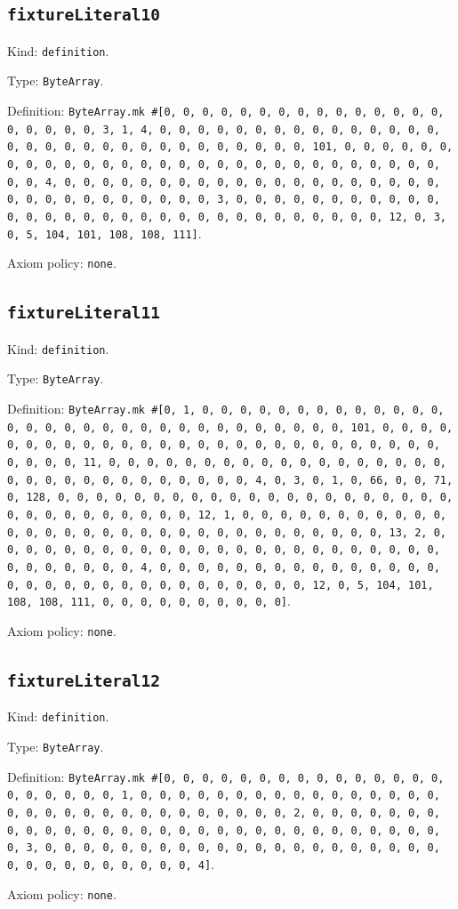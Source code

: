 \documentclass[11pt]{article}
\begin{document}
\subsection*{\texttt{fixtureLiteral10}}
\noindent Kind: \texttt{definition}.\par
\noindent Type: \texttt{ByteArray}.\par
\noindent Definition: \texttt{ByteArray.mk \#[0, 0, 0, 0, 0, 0, 0, 0, 0, 0, 0, 0, 0, 0, 0, 0, 0, 0, 0, 0, 3, 1, 4, 0, 0, 0, 0, 0, 0, 0, 0, 0, 0, 0, 0, 0, 0, 0, 0, 0, 0, 0, 0, 0, 0, 0, 0, 0, 0, 0, 0, 0, 0, 0, 101, 0, 0, 0, 0, 0, 0, 0, 0, 0, 0, 0, 0, 0, 0, 0, 0, 0, 0, 0, 0, 0, 0, 0, 0, 0, 0, 0, 0, 0, 0, 0, 4, 0, 0, 0, 0, 0, 0, 0, 0, 0, 0, 0, 0, 0, 0, 0, 0, 0, 0, 0, 0, 0, 0, 0, 0, 0, 0, 0, 0, 0, 0, 0, 3, 0, 0, 0, 0, 0, 0, 0, 0, 0, 0, 0, 0, 0, 0, 0, 0, 0, 0, 0, 0, 0, 0, 0, 0, 0, 0, 0, 0, 0, 0, 0, 12, 0, 3, 0, 5, 104, 101, 108, 108, 111]}.\par
\noindent Axiom policy: \texttt{none}.\par
\subsection*{\texttt{fixtureLiteral11}}
\noindent Kind: \texttt{definition}.\par
\noindent Type: \texttt{ByteArray}.\par
\noindent Definition: \texttt{ByteArray.mk \#[0, 1, 0, 0, 0, 0, 0, 0, 0, 0, 0, 0, 0, 0, 0, 0, 0, 0, 0, 0, 0, 0, 0, 0, 0, 0, 0, 0, 0, 0, 0, 0, 0, 101, 0, 0, 0, 0, 0, 0, 0, 0, 0, 0, 0, 0, 0, 0, 0, 0, 0, 0, 0, 0, 0, 0, 0, 0, 0, 0, 0, 0, 0, 0, 0, 11, 0, 0, 0, 0, 0, 0, 0, 0, 0, 0, 0, 0, 0, 0, 0, 0, 0, 0, 0, 0, 0, 0, 0, 0, 0, 0, 0, 0, 0, 0, 0, 4, 0, 3, 0, 1, 0, 66, 0, 0, 71, 0, 128, 0, 0, 0, 0, 0, 0, 0, 0, 0, 0, 0, 0, 0, 0, 0, 0, 0, 0, 0, 0, 0, 0, 0, 0, 0, 0, 0, 0, 0, 0, 0, 12, 1, 0, 0, 0, 0, 0, 0, 0, 0, 0, 0, 0, 0, 0, 0, 0, 0, 0, 0, 0, 0, 0, 0, 0, 0, 0, 0, 0, 0, 0, 0, 0, 13, 2, 0, 0, 0, 0, 0, 0, 0, 0, 0, 0, 0, 0, 0, 0, 0, 0, 0, 0, 0, 0, 0, 0, 0, 0, 0, 0, 0, 0, 0, 0, 0, 4, 0, 0, 0, 0, 0, 0, 0, 0, 0, 0, 0, 0, 0, 0, 0, 0, 0, 0, 0, 0, 0, 0, 0, 0, 0, 0, 0, 0, 0, 0, 0, 12, 0, 5, 104, 101, 108, 108, 111, 0, 0, 0, 0, 0, 0, 0, 0, 0, 0]}.\par
\noindent Axiom policy: \texttt{none}.\par
\subsection*{\texttt{fixtureLiteral12}}
\noindent Kind: \texttt{definition}.\par
\noindent Type: \texttt{ByteArray}.\par
\noindent Definition: \texttt{ByteArray.mk \#[0, 0, 0, 0, 0, 0, 0, 0, 0, 0, 0, 0, 0, 0, 0, 0, 0, 0, 0, 0, 0, 1, 0, 0, 0, 0, 0, 0, 0, 0, 0, 0, 0, 0, 0, 0, 0, 0, 0, 0, 0, 0, 0, 0, 0, 0, 0, 0, 0, 0, 0, 0, 0, 2, 0, 0, 0, 0, 0, 0, 0, 0, 0, 0, 0, 0, 0, 0, 0, 0, 0, 0, 0, 0, 0, 0, 0, 0, 0, 0, 0, 0, 0, 0, 0, 3, 0, 0, 0, 0, 0, 0, 0, 0, 0, 0, 0, 0, 0, 0, 0, 0, 0, 0, 0, 0, 0, 0, 0, 0, 0, 0, 0, 0, 0, 0, 0, 4]}.\par
\noindent Axiom policy: \texttt{none}.\par
\end{document}
